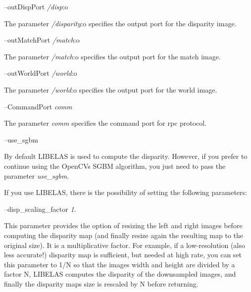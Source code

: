 --out\+Disp\+Port {\itshape /disp}\+:o
\begin{DoxyItemize}
\item The parameter {\itshape /disparity}\+:o specifies the output port for the disparity image.
\end{DoxyItemize}

--out\+Match\+Port {\itshape /match}\+:o
\begin{DoxyItemize}
\item The parameter {\itshape /match}\+:o specifies the output port for the match image.
\end{DoxyItemize}

--out\+World\+Port {\itshape /world}\+:o
\begin{DoxyItemize}
\item The parameter {\itshape /world}\+:o specifies the output port for the world image.
\end{DoxyItemize}

--Command\+Port {\itshape comm} 
\begin{DoxyItemize}
\item The parameter {\itshape comm} specifies the command port for rpc protocol.
\end{DoxyItemize}

--use\+\_\+sgbm
\begin{DoxyItemize}
\item By default L\+I\+B\+E\+L\+A\+S is used to compute the disparity. However, if you prefer to continue using the Open\+C\+V\textquotesingle{}s S\+G\+B\+M algorithm, you just need to pass the parameter {\itshape use\+\_\+sgbm}.
\end{DoxyItemize}

If you use L\+I\+B\+E\+L\+A\+S, there is the possibility of setting the following parameters\+:

--disp\+\_\+scaling\+\_\+factor {\itshape 1.} 
\begin{DoxyItemize}
\item This parameter provides the option of resizing the left and right images before computing the disparity map (and finally resize again the resulting map to the original size). It is a multiplicative factor. For example, if a low-\/resolution (also less accurate!) disparity map is sufficient, but needed at high rate, you can set this parameter to 1/\+N so that the images width and height are divided by a factor N, L\+I\+B\+E\+L\+A\+S computes the disparity of the downsampled images, and finally the disparity map\textquotesingle{}s size is rescaled by N before returning.
\end{DoxyItemize}

